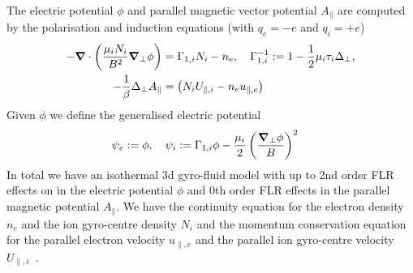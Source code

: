 The electric potential \(\phi\) and parallel magnetic vector potential \(A_\parallel\) are
computed by the polarisation and induction equations (with $q_e=-e$ and $q_i=+e$)
\begin{align}
 -{\boldsymbol{\nabla}}\cdot\left(\frac{\mu_iN_i}{B^2} {\boldsymbol{\nabla}}_{\perp} \phi\right) &=  \Gamma_{1,i} N_i -n_e, \quad \Gamma_{1,i}^{-1} := 1-\frac{1}{2}\mu_i\tau_i\Delta_\perp , \\
  -\frac{1}{\beta} \Delta_\perp A_\parallel &= \left(N_i U_{\parallel,i}-n_e u_{\parallel,e} \right)
  \label{eq:polarisation_dimensional}
\end{align}
Given $\phi$ we define the generalised electric potential
\begin{align}
    \psi_e := \phi,\quad \psi_i&:= \Gamma_{1,i} \phi - \frac{\mu_i }{2}\left(\frac{{\boldsymbol{\nabla}}_{\perp}\phi}{B}\right)^2
\end{align}
In total
we have an isothermal 3d gyro-fluid model with up to 2nd order FLR effects
on in the electric potential $\phi$ and 0th order FLR effects in the parallel magnetic
potential $A_\parallel$.
We have the continuity equation for the electron density \(n_e\) and the ion gyro-centre
density \(N_i\) and the momentum conservation equation for
the parallel electron velocity \(u_{\parallel,e}\) and the parallel ion gyro-centre velocity \(U_{\parallel,i}\)~\cite{WiesenbergerPhD, HeldPhD}.
